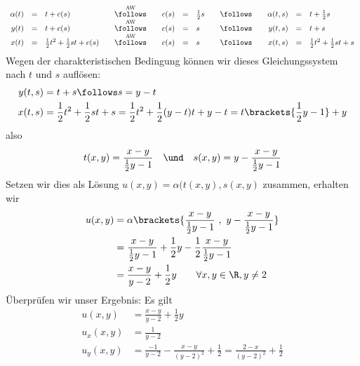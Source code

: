 \begin{exercisePage}
\begin{equation*}
\begin{array}{rclcrclcrcl}
			\alpha(t) &=& t + c(s) &\quad\overset{\text{AW}}{\follows}\quad& c(s) &= &\frac{1}{2} s &\quad\follows\quad& \alpha(t,s) &=& t + \frac{1}{2} s \\
			y(t) &=& t + c(s) &\quad\overset{\text{AW}}{\follows}\quad& c(s) &=& s &\quad\follows\quad& y(t,s) &=& t + s \\
			x(t) &=& \frac{1}{2} t^2 + \frac{1}{2} s t + c(s) &\quad\overset{\text{AW}}{\follows}\quad& c(s) &=& s &\quad\follows\quad& x(t,s) &=&  \frac{1}{2} t^2 + \frac{1}{2} s t + s
		\end{array}
	\end{equation*}
	Wegen der charakteristischen Bedingung können wir dieses Gleichungssystem nach $t$ und $s$ auflösen:
	\begin{equation*}
		\begin{aligned}
			y(t,s) &= t + s \follows s = y - t \\
			x(t,s) &= \frac{1}{2}t^2 + \frac{1}{2} s t + s = \frac{1}{2}t^2 + \frac{1}{2} (y - t) t + y - t = t \brackets{\frac{1}{2} y - 1} + y
		\end{aligned}
	\end{equation*}
	also
	\begin{equation*}
		t(x,y) = \frac{x-y}{\frac{1}{2} y - 1} \quad \und \quad s(x,y) = y - \frac{x-y}{\frac{1}{2} y - 1}
	\end{equation*}
	Setzen wir dies als Lösung $u(x,y) = \alpha(t(x,y),s(x,y)$ zusammen, erhalten wir
	\begin{equation*}
		\begin{aligned}
			u(x,y) &= \alpha\brackets{\frac{x-y}{\frac{1}{2}y - 1} \ , \ y - \frac{x-y}{\frac{1}{2} y - 1}} \\
			&= \frac{x-y}{\frac{1}{2}y - 1} + \frac{1}{2} y - \frac{1}{2} \frac{x-y}{\frac{1}{2} y - 1} \\
			&= \frac{x-y}{y - 2} + \frac{1}{2} y \qquad \forall x, y \in \R, y \neq 2
		\end{aligned}
	\end{equation*} 
	Überprüfen wir unser Ergebnis:
	Es gilt
	\begin{equation*}
		\begin{aligned}
			u(x,y) &= \frac{x-y}{y - 2} + \frac{1}{2} y \\
			u_x(x,y) &= \frac{1}{y-2} \\
			u_y(x,y) &= \frac{-1}{y-2} -  \frac{x-y}{(y-2)^2} + \frac{1}{2} =\frac{2-x}{(y-2)^2} + \frac{1}{2}
		\end{aligned}
	\end{equation*}

\end{exercisePage}
